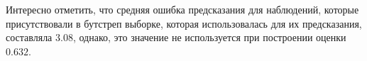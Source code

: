 \begin{figure}[h]
\end{figure}
Интересно отметить, что средняя ошибка предсказания для наблюдений, которые присутствовали в бутстреп выборке, которая использовалась для их предсказания, составляла $3.08$, однако, это значение не используется при построении оценки $0.632$.